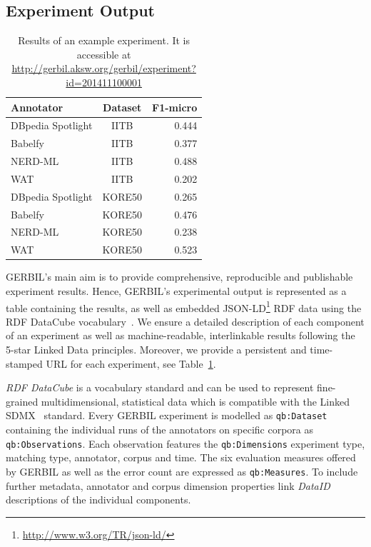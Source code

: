 \subsection{Experiment Output}
\label{sec:output}

\begin{table}[tb!]
    \begin{tabular}{lcr}
    \toprule
    Annotator & Dataset & F1-micro \\
    \midrule
    DBpedia Spotlight & IITB & 0.444 \\
    Babelfy & IITB & 0.377 \\
    NERD-ML & IITB & 0.488 \\
    WAT & IITB & 0.202 \\
    DBpedia Spotlight & KORE50 & 0.265 \\
    Babelfy & KORE50 & 0.476 \\
    NERD-ML & KORE50 & 0.238 \\
    WAT & KORE50 & 0.523 \\
	\bottomrule
	\end{tabular}
	\centering
    \caption{Results of an example experiment. It is accessible at \url{http://gerbil.aksw.org/gerbil/experiment?id=201411100001}}
	\label{tab:persistentURL}
\end{table}

GERBIL's main aim is to provide comprehensive, reproducible and publishable experiment results.
Hence, GERBIL's experimental output is represented as a table containing the results, as well as embedded JSON-LD\footnote{\url{http://www.w3.org/TR/json-ld/}} \ac{RDF} data using the RDF DataCube vocabulary~\cite{datacube}.
We ensure a detailed description of each component of an experiment as well as machine-readable, interlinkable results following the 5-star Linked Data principles.
Moreover, we provide a persistent and time-stamped URL for each experiment, see Table~\ref{tab:persistentURL}.


\emph{RDF DataCube} is a vocabulary standard and can be used to represent fine-grained multidimensional, statistical data which is compatible with the  Linked SDMX~\cite{LinkedSDMX} standard. 
Every GERBIL experiment is modelled as \texttt{qb:Dataset} containing the individual runs of the annotators on specific corpora as \texttt{qb:Observations}. 
Each observation features the \texttt{qb:Dimensions} experiment type, matching type, annotator, corpus and time. 
The six evaluation measures offered by GERBIL as well as the error count are expressed as \texttt{qb:Measures}. 
To include further metadata, annotator and corpus dimension properties link \emph{DataID}~\cite{dataID} descriptions of the individual components. 

